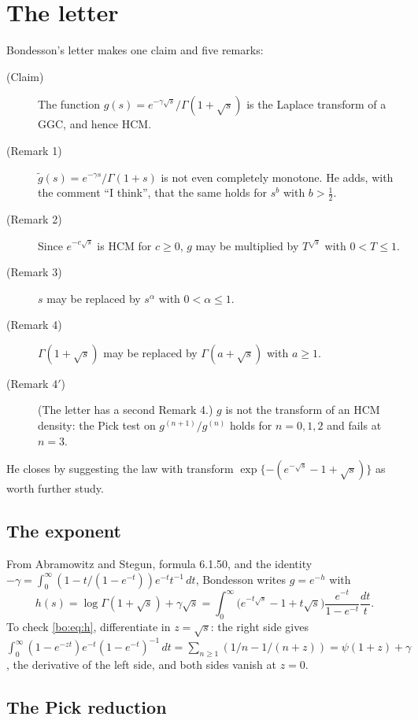 \section{The letter}

Bondesson's letter makes one claim and five remarks:
\begin{description}
\item[(Claim)] The function $g(s)=e^{-\gamma\sqrt s}/\Gamma(1+\sqrt s)$ is the Laplace transform of a GGC, and hence HCM.
\item[(Remark 1)] $\tilde g(s)=e^{-\gamma s}/\Gamma(1+s)$ is not even completely monotone. He adds, with the comment ``I think'', that the same holds for $s^b$ with $b>\frac12$.
\item[(Remark 2)] Since $e^{-c\sqrt s}$ is HCM for $c\ge0$, $g$ may be multiplied by $T^{\sqrt s}$ with $0<T\le1$.
\item[(Remark 3)] $s$ may be replaced by $s^\alpha$ with $0<\alpha\le1$.
\item[(Remark 4)] $\Gamma(1+\sqrt s)$ may be replaced by $\Gamma(a+\sqrt s)$ with $a\ge1$.
\item[(Remark 4$'$)] (The letter has a second Remark 4.) $g$ is not the transform of an HCM density: the Pick test on $g^{(n+1)}/g^{(n)}$ holds for $n=0,1,2$ and fails at $n=3$.
\end{description}
He closes by suggesting the law with transform $\exp\{-(e^{-\sqrt s}-1+\sqrt s)\}$ as worth further study.

\subsection{The exponent}

From Abramowitz and Stegun, formula 6.1.50, and the identity $-\gamma=\int_0^\infty(1-t/(1-e^{-t}))e^{-t}t^{-1}\,dt$, Bondesson writes $g=e^{-h}$ with
\begin{equation}\label{bo:eq:h}
h(s)=\log\Gamma(1+\sqrt s)+\gamma\sqrt s=\int_0^\infty\big(e^{-t\sqrt s}-1+t\sqrt s\big)\frac{e^{-t}}{1-e^{-t}}\frac{dt}{t}.
\end{equation}
To check \eqref{bo:eq:h}, differentiate in $z=\sqrt s$: the right side gives $\int_0^\infty(1-e^{-zt})e^{-t}(1-e^{-t})^{-1}\,dt=\sum_{n\ge1}(1/n-1/(n+z))=\psi(1+z)+\gamma$, the derivative of the left side, and both sides vanish at $z=0$.

\subsection{The Pick reduction}

